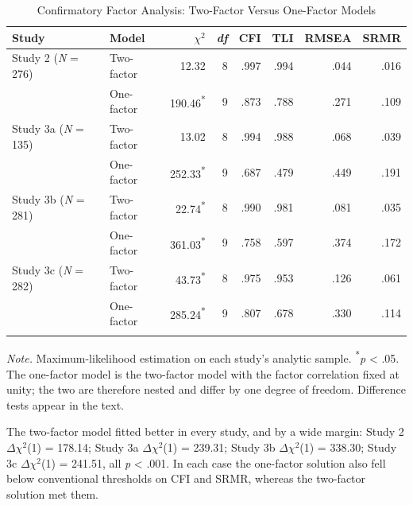 \documentclass[12pt, a4paper]{article}
\begin{document}
\setcounter{table}{0}
\renewcommand{\thetable}{H\arabic{table}}
\renewcommand{\theHtable}{H\arabic{table}}

\begin{table}[H]
\centering
\begin{singlespace}
\caption{Confirmatory Factor Analysis: Two-Factor Versus One-Factor Models}
\begin{tabular}{@{}llrrrrrr@{}}
\toprule
Study & Model & $\chi^2$ & \emph{df} & CFI & TLI & RMSEA & SRMR \\
\midrule
Study 2 (\emph{N} = 276) & Two-factor & 12.32 & 8 & .997 & .994 & .044 & .016 \\
 & One-factor & 190.46\textsuperscript{*} & 9 & .873 & .788 & .271 & .109 \\
\addlinespace
Study 3a (\emph{N} = 135) & Two-factor & 13.02 & 8 & .994 & .988 & .068 & .039 \\
 & One-factor & 252.33\textsuperscript{*} & 9 & .687 & .479 & .449 & .191 \\
\addlinespace
Study 3b (\emph{N} = 281) & Two-factor & 22.74\textsuperscript{*} & 8 & .990 & .981 & .081 & .035 \\
 & One-factor & 361.03\textsuperscript{*} & 9 & .758 & .597 & .374 & .172 \\
\addlinespace
Study 3c (\emph{N} = 282) & Two-factor & 43.73\textsuperscript{*} & 8 & .975 & .953 & .126 & .061 \\
 & One-factor & 285.24\textsuperscript{*} & 9 & .807 & .678 & .330 & .114 \\
\addlinespace
\bottomrule
\end{tabular}
\raggedright\emph{Note.} Maximum-likelihood estimation on each study's analytic sample. \textsuperscript{*}\emph{p} \textless{} .05. The one-factor model is the two-factor model with the factor correlation fixed at unity; the two are therefore nested and differ by one degree of freedom. Difference tests appear in the text.
\end{singlespace}
\end{table}

The two-factor model fitted better in every study, and by a wide margin: Study 2 $\Delta\chi^2$(1) = 178.14; Study 3a $\Delta\chi^2$(1) = 239.31; Study 3b $\Delta\chi^2$(1) = 338.30; Study 3c $\Delta\chi^2$(1) = 241.51, all \emph{p} \textless{} .001. In each case the one-factor solution also fell below conventional thresholds on CFI and SRMR, whereas the two-factor solution met them.
\end{document}

